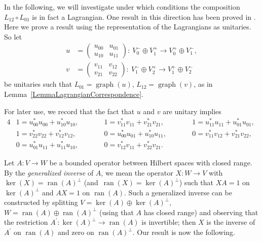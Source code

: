 \documentclass[pdftex]{sigma}
\numberwithin{equation}{section}
\DeclareMathOperator*{\ran}{ran}
\DeclareMathOperator{\graph}{\mathrm{graph}}
\begin{document}
In the following, we will investigate under which conditions the composition $L_{12} \circ L_{01}$ is in fact a Lagrangian.
One result in this direction has been proved in \cite[Section~2.2, Theorem~2.11]{LudewigRoos}.
Here we prove a result using the representation of the Lagrangians as unitaries.
So let
\begin{align}
 u &= \begin{pmatrix} u_{00} & u_{01} \\ u_{10} & u_{11} \end{pmatrix} \colon\ V_0^- \oplus V_1^+ \longrightarrow V_0^+ \oplus V_1^-,\nonumber \\
 v &= \begin{pmatrix} v_{11} & v_{12} \\ v_{21} & v_{22} \end{pmatrix}\colon\ V_1^- \oplus V_2^+ \longrightarrow V_1^+ \oplus V_2^- \label{MatrixRepUV}
\end{align}
 be unitaries such that $L_{01} = \graph(u)$, $L_{12} = \graph(v)$, as in Lemma~\ref{LemmaLagrangianCorrespondence}.

\begin{Remark}
For later use, we record that the fact that $u$ and $v$ are unitary implies
\begin{alignat}{4}
 & 1 = u_{00}^* u_{00} + u_{10}^* u_{10}, \qquad && 1 = v_{11}^* v_{11} + v_{21}^* v_{21}, \qquad&&
 1 = u_{11}^* u_{11} + u_{01}^* u_{01}, &\nonumber \\
& 1 = v_{22}^* v_{22} + v_{12}^* v_{12}, \qquad&&
 0 = u_{00}^* u_{01} + u_{10}^* u_{11}, \qquad&& 0 = v_{11}^* v_{12} + v_{21}^* v_{22},&\nonumber \\
& 0 = u_{01}^* u_{11} + u_{11}^* u_{10}, \qquad&& 0 = v_{12}^* v_{11} + v_{22}^* v_{21}.&&&\label{uvUnitary}
\end{alignat}
\end{Remark}

Let $A\colon V \to W$ be a bounded operator between Hilbert spaces with closed range.
By the \emph{generalized inverse} of $A$, we mean the operator $X \colon W \to V$ with $\ker(X) = \ran(A)^\perp$ (and~${\ran(X) = \ker(A)^\perp}$) such that $XA = 1$ on $\ker(A)^\perp$ and $AX = 1$ on $\ran(A)$.
Such a generalized inverse can be constructed by splitting $V = \ker(A) \oplus \ker(A)^\perp$, $W = \ran(A) \oplus \ran(A)^\perp$ (using that $A$ has closed range) and observing that the restriction $A^\prime\colon \ker(A)^\perp \to \ran(A)$ is invertible; then $X$ is the inverse of $A^\prime$ on $\ran(A)$ and zero on $\ran(A)^\perp$.
Our result is now the following.
\end{document}
